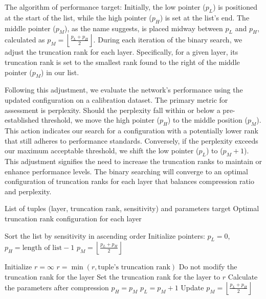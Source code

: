 The algorithm of performance target:
Initially, the low pointer (\(p_L\)) is positioned at the start of the list, while the high pointer (\(p_H\)) is set at the list's end. The middle pointer (\(p_M\)), as the name suggests, is placed midway between \(p_L\) and \(p_H\), calculated as $p_M = \left\lfloor \frac{p_L + p_H}{2} \right\rfloor$.
During each iteration of the binary search, we adjust the truncation rank for each layer. Specifically, for a given layer, its truncation rank is set to the smallest rank found to the right of the middle pointer (\(p_M\)) in our list.

Following this adjustment, we evaluate the network's performance using the updated configuration on a calibration dataset. The primary metric for assessment is perplexity. Should the perplexity fall within or below a pre-established threshold, we move the high pointer (\(p_H\)) to the middle position (\(p_M\)). This action indicates our search for a configuration with a potentially lower rank that still adheres to performance standards.
Conversely, if the perplexity exceeds our maximum acceptable threshold, we shift the low pointer (\(p_L\)) to (\(p_M+1\)). This adjustment signifies the need to increase the truncation ranks to maintain or enhance performance levels. 
The binary searching will converge to an optimal configuration of truncation ranks for each layer that balances compression ratio and perplexity.

\begin{algorithm}[tb]
   \caption{Binary Search for Truncation Ranks (parameters target)}
   \label{alg:binary_search_parameters}
\begin{algorithmic}
    List of tuples (layer, truncation rank, sensitivity) and parameters target
    Optimal truncation rank configuration for each layer

   \STATE Sort the list by sensitivity in ascending order
   \STATE Initialize pointers: \(p_L = 0\), \(p_H = \text{length of list} - 1\)
   \STATE \(p_M = \left\lfloor \frac{p_L + p_H}{2} \right\rfloor\)

         \STATE Initialize \(r = \infty\)
               \STATE \(r = \min(r, \text{tuple's truncation rank})\)
            \ENDIF
         \ENDFOR
            \STATE Do not modify the truncation rank for the layer
         \ELSE
            \STATE Set the truncation rank for the layer to \(r\)
         \ENDIF
      \ENDFOR
      \STATE Calculate the parameters after compression
         \STATE \(p_H = p_M\)
      \ELSE
         \STATE \(p_L = p_M+1\)
      \ENDIF
      \STATE Update \(p_M = \left\lfloor \frac{p_L + p_H}{2} \right\rfloor\)
   \ENDWHILE
\end{algorithmic}
\end{algorithm}


